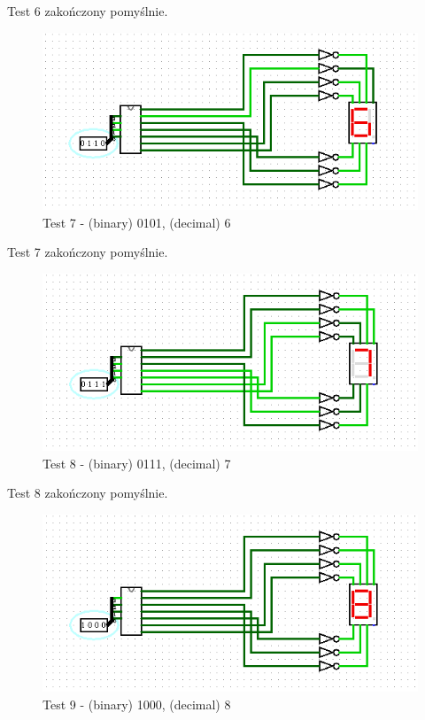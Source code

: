 Test 6 zakończony pomyślnie.

\begin{figure}[H]
    \includegraphics[width=\linewidth]{ScreenshotsTests/Comp 1/Comp 1_00003.png}
    \caption{Test 7 - (binary) 0101, (decimal) 6}
    \label{fig:test6}
\end{figure}

Test 7 zakończony pomyślnie.

\begin{figure}[H]
    \includegraphics[width=\linewidth]{ScreenshotsTests/Comp 1/Comp 1_00002.png}
    \caption{Test 8 - (binary) 0111, (decimal) 7}
    \label{fig:test7}
\end{figure}

Test 8 zakończony pomyślnie.

\begin{figure}[H]
    \includegraphics[width=\linewidth]{ScreenshotsTests/Comp 1/Comp 1_00001.png}
    \caption{Test 9 - (binary) 1000, (decimal) 8}
    \label{fig:test8}
\end{figure}

